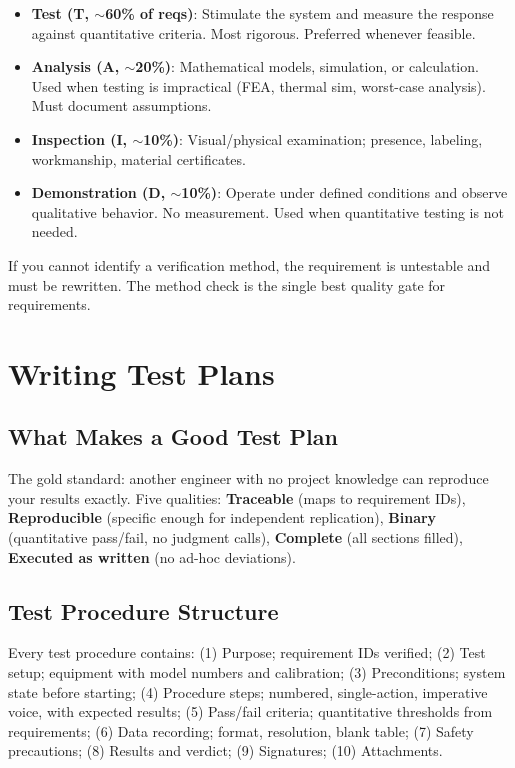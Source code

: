 \begin{itemize}[leftmargin=1.5em]
\item \textbf{Test (T, $\sim$60\% of reqs)}: Stimulate the system and measure the response against quantitative criteria. Most rigorous. Preferred whenever feasible.
\item \textbf{Analysis (A, $\sim$20\%)}: Mathematical models, simulation, or calculation. Used when testing is impractical (FEA, thermal sim, worst-case analysis). Must document assumptions.
\item \textbf{Inspection (I, $\sim$10\%)}: Visual/physical examination; presence, labeling, workmanship, material certificates.
\item \textbf{Demonstration (D, $\sim$10\%)}: Operate under defined conditions and observe qualitative behavior. No measurement. Used when quantitative testing is not needed.
\end{itemize}

\begin{tipbox}
If you cannot identify a verification method, the requirement is untestable and must be rewritten. The method check is the single best quality gate for requirements.
\end{tipbox}

\section{Writing Test Plans}
\subsection{What Makes a Good Test Plan}
The gold standard: another engineer with no project knowledge can reproduce your results exactly. Five qualities: \textbf{Traceable} (maps to requirement IDs), \textbf{Reproducible} (specific enough for independent replication), \textbf{Binary} (quantitative pass/fail, no judgment calls), \textbf{Complete} (all sections filled), \textbf{Executed as written} (no ad-hoc deviations).

\subsection{Test Procedure Structure}


Every test procedure contains: (1) Purpose; requirement IDs verified; (2) Test setup; equipment with model numbers and calibration; (3) Preconditions; system state before starting; (4) Procedure steps; numbered, single-action, imperative voice, with expected results; (5) Pass/fail criteria; quantitative thresholds from requirements; (6) Data recording; format, resolution, blank table; (7) Safety precautions; (8) Results and verdict; (9) Signatures; (10) Attachments.

